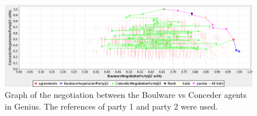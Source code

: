 \documentclass[a4paper]{article}
\begin{document}
\begin{figure}[h!]
\centering
\includegraphics[width=125mm]{boulvsconcede.png}
\caption{Graph of the negotiation between the Boulware vs Conceder agents in Genius. The references of party 1 and party 2 were used.}
\label{fig:Boulware vs Conceder agent}
\end{figure}
\end{document}
